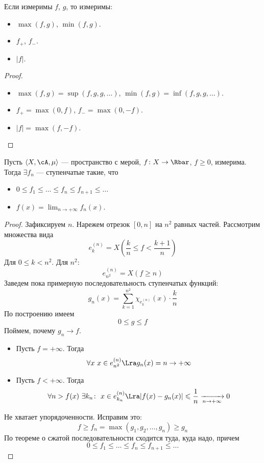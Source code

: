 \begin{corollary}
	Если измеримы $f$, $g$, то измеримы:
	\begin{itemize}
		\item $\max(f, g)$, $\min(f, g)$.
		\item $f_{+}$, $f_{-}$.
		\item $|f|$.
	\end{itemize}
\end{corollary}
\begin{proof}
	\enewline
	\begin{itemize}
		\item $\max(f, g) = \sup(f, g, g, \ldots)$, $\min(f, g) = \inf(f, g, g, \ldots)$.
		\item $f_{+} = \max(0, f)$, $f_{-} = \max(0, -f)$.
		\item $|f| = \max(f, -f)$.
	\end{itemize}
\end{proof}

\begin{theorem}
	Пусть $\langle X, \cA, \mu \rangle$ --- пространство с мерой, 
	$f \colon X \to \Rbar$, $f \geqslant 0$, измерима. Тогда
	$\exists f_n$ --- ступенчатые такие, что
\begin{itemize}
	\item $0 \leqslant f_1 \leqslant \ldots \leqslant f_n \leqslant f_{n + 1}
		\leqslant \ldots$
	\item $\displaystyle f(x) = \lim_{n \to +\infty}{f_n(x)}$.
\end{itemize}
\end{theorem}
\begin{proof}
	Зафиксируем $n$. Нарежем отрезок $[0, n]$ на $n^2$ равных частей. 
	Рассмотрим множества вида
\[
	e^{(n)}_k = X\left(\frac{k}{n} \leqslant f < \frac{k + 1}{n}\right)
\]
	Для $0 \leqslant k < n^2$. Для $n^2$:
\[
	e^{(n)}_{n^2} = X(f \geqslant n)
\]
	Заведем пока примерную последовательность ступенчатых функций:
\[
	g_n(x) = \sum_{k = 1}^{n^2}{\chi_{e^{(n)}_k}(x) \cdot \frac{k}{n}}
\]
	По построению имеем
\[
	0 \leqslant g \leqslant f
\]
	Поймем, почему $g_n \to f$.
	\begin{itemize}
		\item Пусть $f = +\infty$. Тогда
\[
	\forall x~ x \in e^{(n)}_{n^2} \Lra g_n(x) = n \to +\infty
\]
		\item Пусть $f < +\infty$. Тогда
\[
	\forall n > f(x)~ \exists k_n\colon~ x \in e^{(n)}_{k_n} \Lra
	|f(x) - g_n(x)| \leqslant \frac{1}{n} \xrightarrow[n \to +\infty]{} 0
\]
	\end{itemize}
	Не хватает упорядоченности. Исправим это:
\[
	f \geqslant f_n = \max(g_1, g_2, \ldots, g_n) \geqslant g_n
\]
	По теореме о сжатой последовательности сходится туда, куда надо,
	причем
\[
	0 \leqslant f_1 \leqslant \ldots \leqslant f_n \leqslant f_{n + 1} \leqslant 
	\ldots
\]
\end{proof}


